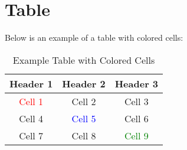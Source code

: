 \documentclass{article}
\begin{document}
\section{Table}

Below is an example of a table with colored cells:

\begin{table}[H]
\centering
\begin{tabular}{|c|c|c|}
\hline
\rowcolor{gray!30} \textbf{Header 1} & \textbf{Header 2} & \textbf{Header 3} \\ \hline
\textcolor{red}{Cell 1}              & Cell 2            & Cell 3            \\ \hline
Cell 4                               & \textcolor{blue}{Cell 5} & Cell 6            \\ \hline
Cell 7                               & Cell 8            & \textcolor{green}{Cell 9}  \\ \hline
\end{tabular}
\caption{Example Table with Colored Cells}
\end{table}
\end{document}
